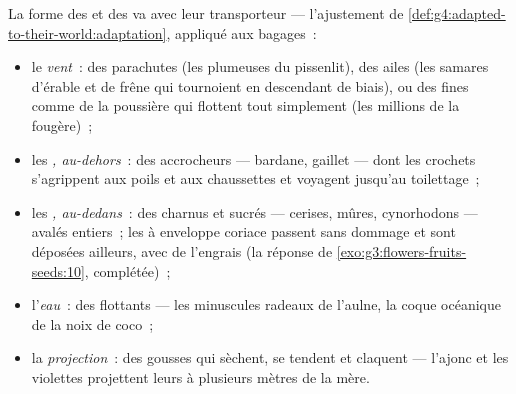 \begin{proposition}\label{prop:g6:how-plants-spread:builds}
La forme des  et des  va avec leur transporteur ---
l'ajustement de
\cref{def:g4:adapted-to-their-world:adaptation}, appliqué aux
bagages~:
\begin{itemize}
  \item le \emph{vent}~: des parachutes (les  plumeuses du
        pissenlit), des ailes (les samares d'érable et de frêne qui
        tournoient en descendant de biais), ou des  fines
        comme de la poussière qui flottent tout simplement (les
        millions de la fougère)~;
  \item les \emph{, au-dehors}~: des  accrocheurs ---
        bardane, gaillet --- dont les crochets s'agrippent aux
        poils et aux chaussettes et voyagent jusqu'au toilettage~;
  \item les \emph{, au-dedans}~: des  charnus et
        sucrés --- cerises, mûres, cynorhodons --- avalés entiers~;
        les  à enveloppe coriace passent sans dommage et
        sont déposées ailleurs, avec de l'engrais
        (la réponse de \cref{exo:g3:flowers-fruits-seeds:10},
        complétée)~;
  \item l'\emph{eau}~: des  flottants --- les minuscules
        radeaux de l'aulne, la coque océanique de la noix de
        coco~;
  \item la \emph{projection}~: des gousses qui sèchent, se tendent
        et claquent --- l'ajonc et les violettes projettent leurs
         à plusieurs mètres de la  mère.
\end{itemize}
\end{proposition}
\admitted


